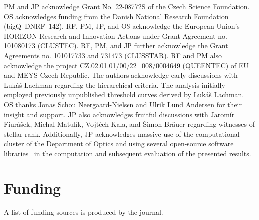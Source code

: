 \documentclass{article}
\begin{document}
PM and JP acknowledge Grant No. 22-08772S of the Czech Science Foundation.
OS acknowledges funding from the Danish National Research Foundation (bigQ~DNRF~142).
RF, PM, JP, and OS acknowledge the European Union's HORIZON Research and Innovation Actions under Grant Agreement no. 101080173 (CLUSTEC).
RF, PM, and JP further acknowledge the Grant Agreements no. 101017733 and 731473 (CLUSSTAR).
RF and PM also acknowledge the project \mbox{CZ.02.01.01/00/22\_008/0004649} (QUEENTEC) of EU and MEYS Czech Republic. 
%
The authors acknowledge early discussions with Luk\'{a}\v{s} Lachman regarding the hierarchical criteria. The analysis initially employed previously unpublished threshold curves derived by Luk\'{a}\v{s} Lachman. 
%
OS thanks Jonas Schou Neergaard-Nielsen and Ulrik Lund Andersen for their insight and support. 
%
JP also acknowledges fruitful discussions with Jarom\'{i}r Fiur\'{a}\v{s}ek, Michal Matul\'{i}k, Vojt\v{e}ch Kala, and \v{S}imon Br\"{a}uer regarding witnesses of stellar rank. 
%
Additionally, JP acknowledges massive use of the computational cluster of the Department of Optics and using several open-source software libraries~\cite{hunter2007,harris2020,virtanen2020,dalcin2021} in the computation and subsequent evaluation of the presented results.

\FloatBarrier
\section*{Funding}

A list of funding sources is produced by the journal.

%

\FloatBarrier
\printbibliography
\end{document}
